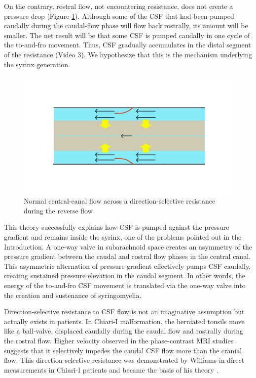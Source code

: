 \documentclass[fleqn,10pt]{wlscirep}
\begin{document}
On the contrary, rostral flow, not encountering resistance, does not create
a pressure drop (Figure \ref{fig:pump_open}). Although some of the CSF that
had been pumped caudally during the caudal-flow phase will flow back
rostrally, its amount will be smaller. The net result will be that some CSF
is pumped caudally in one cycle of the to-and-fro movement. Thus, CSF
gradually accumulates in the distal segment of the resistance (Video 3). We
hypothesize that this is the mechanism underlying the syrinx generation.

\begin{figure}[hbt]
    \centering
    \includegraphics[width=\textwidth]{pumping_mechanism_open.jpg}
    \caption{Normal central-canal flow across a direction-selective
    resistance during the reverse flow}
    \label{fig:pump_open}
\end{figure}

This theory successfully explains how CSF is pumped against the pressure
gradient and remains inside the syrinx, one of the problems pointed out in
the Introduction. A one-way valve in subarachnoid space creates an
asymmetry of the pressure gradient between the caudal and rostral flow
phases in the central canal. This asymmetric alternation of pressure
gradient effectively pumps CSF caudally, creating sustained pressure
elevation in the caudal segment. In other words, the energy of the
to-and-fro CSF movement is translated via the one-way valve into the
creation and sustenance of syringomyelia.

Direction-selective resistance to CSF flow is not an imaginative assumption
but actually exists in patients. In Chiari-I malformation, the herniated
tonsils move like a ball-valve, displaced caudally during the caudal flow
and rostrally during the rostral flow. Higher velocity observed in the
phase-contrast MRI studies suggests that it selectively impedes the caudal
CSF flow more than the cranial flow. This direction-selective resistance
was demonstrated by Williams in direct measurements in Chiari-I patients
and became the basis of his theory \cite{williams1981simultaneous}.
\end{document}
